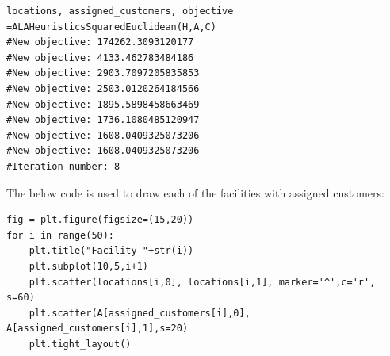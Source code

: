 \documentclass[12pt]{article}
\begin{document}
\begin{lstlisting}[style=pythonstyle]
locations, assigned_customers, objective =ALAHeuristicsSquaredEuclidean(H,A,C)
#New objective: 174262.3093120177
#New objective: 4133.462783484186
#New objective: 2903.7097205835853
#New objective: 2503.0120264184566
#New objective: 1895.5898458663469
#New objective: 1736.1080485120947
#New objective: 1608.0409325073206
#New objective: 1608.0409325073206
#Iteration number: 8
\end{lstlisting}

The below code is used to draw each of the facilities with assigned customers:
\begin{lstlisting}[style=pythonstyle]
fig = plt.figure(figsize=(15,20))
for i in range(50):
    plt.title("Facility "+str(i))
    plt.subplot(10,5,i+1)
    plt.scatter(locations[i,0], locations[i,1], marker='^',c='r', s=60)
    plt.scatter(A[assigned_customers[i],0], A[assigned_customers[i],1],s=20)
    plt.tight_layout()
\end{lstlisting}
\end{document}

